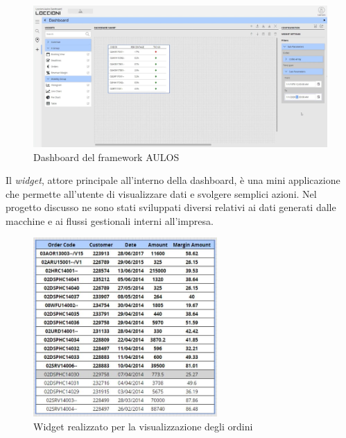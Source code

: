 \begin{figure}[h]
\begin{center}
  \includegraphics[width=14cm]{images/dashboard_aulos.JPG}
  \caption{Dashboard del framework AULOS}
\end{center}
\end{figure}
\pagebreak
Il \textit{widget}, attore principale all'interno della dashboard,
è una mini applicazione che permette all'utente di visualizzare dati e svolgere semplici azioni. Nel progetto discusso ne sono stati sviluppati diversi relativi ai dati generati dalle macchine e ai flussi gestionali interni all'impresa.
\begin{figure}[h]
\begin{center}
  \includegraphics[width=7cm]{images/orders_widget.jpg}
  \caption{Widget realizzato per la visualizzazione degli ordini}
\end{center}
\end{figure}
